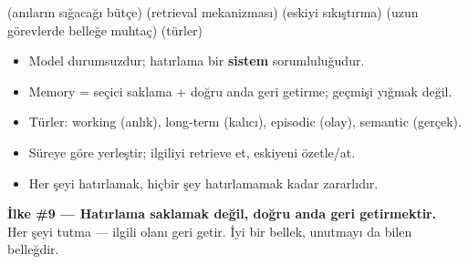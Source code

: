  (anıların sığacağı bütçe) \tlsep {} (retrieval mekanizması) \tlsep
{} (eskiyi sıkıştırma) \tlsep {} (uzun görevlerde belleğe muhtaç) \tlsep
{} (türler)

\begin{itemize}
  \item Model durumsuzdur; hatırlama bir \textbf{sistem} sorumluluğudur.
  \item Memory = seçici saklama + doğru anda geri getirme; geçmişi yığmak değil.
  \item Türler: working (anlık), long-term (kalıcı), episodic (olay), semantic (gerçek).
  \item Süreye göre yerleştir; ilgiliyi retrieve et, eskiyeni özetle/at.
  \item Her şeyi hatırlamak, hiçbir şey hatırlamamak kadar zararlıdır.
\end{itemize}

\begin{principlebox}
\textbf{İlke \#9 — Hatırlama saklamak değil, doğru anda geri getirmektir.}\\[4pt]
\normalsize Her şeyi tutma --- ilgili olanı geri getir. İyi bir bellek,
unutmayı da bilen belleğdir.
\end{principlebox}
